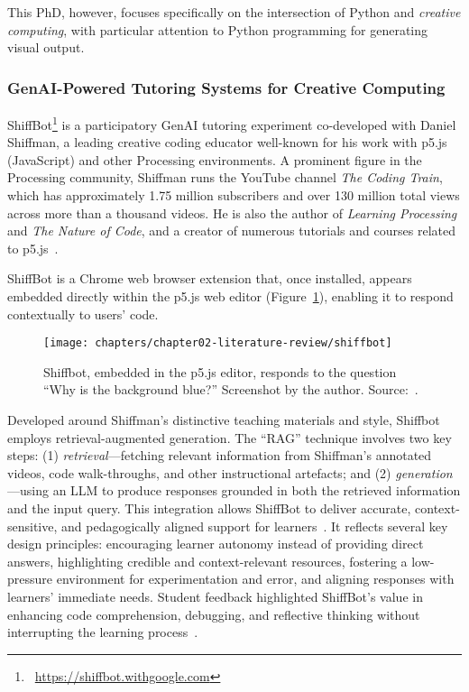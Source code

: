 This PhD, however, focuses specifically on the intersection of Python and \textit{creative computing}, with particular attention to Python programming for generating visual output.

\subsubsection{GenAI-Powered Tutoring Systems for Creative Computing}

ShiffBot\footnote{~\url{https://shiffbot.withgoogle.com}} is a participatory GenAI tutoring experiment co-developed with Daniel Shiffman, a leading creative coding educator well-known for his work with p5.js (JavaScript) and other Processing environments. A prominent figure in the Processing community, Shiffman runs the YouTube channel \textit{The Coding Train}, which has approximately 1.75 million subscribers and over 130 million total views across more than a thousand videos. He is also the author of \textit{Learning Processing} and \textit{The Nature of Code}, and a creator of numerous tutorials and courses related to p5.js~\cite{shiffman_coding_2025}. 

ShiffBot is a Chrome web browser extension that, once installed, appears embedded directly within the p5.js web editor (Figure~\ref{fig:shiffbot}), enabling it to respond contextually to users' code.

\begin{figure}[htbp]
\centering
\texttt{[image: chapters/chapter02-literature-review/shiffbot]}
\caption{Shiffbot, embedded in the p5.js editor, responds to the question ``Why is the background blue?'' Screenshot by the author. Source:~\cite{p5js_contributors_p5js_2025}.}
\label{fig:shiffbot}
\end{figure}

Developed around Shiffman's distinctive teaching materials and style, Shiffbot employs retrieval-augmented generation. The ``RAG'' technique involves two key steps: (1) \textit{retrieval}---fetching relevant information from Shiffman's annotated videos, code walk-throughs, and other instructional artefacts; and (2) \textit{generation}---using an LLM to produce responses grounded in both the retrieved information and the input query. This integration allows ShiffBot to deliver accurate, context-sensitive, and pedagogically aligned support for learners~\cite{rubinovitz_how_2024}. It reflects several key design principles: encouraging learner autonomy instead of providing direct answers, highlighting credible and context-relevant resources, fostering a low-pressure environment for experimentation and error, and aligning responses with learners' immediate needs. Student feedback highlighted ShiffBot's value in enhancing code comprehension, debugging, and reflective thinking without interrupting the learning process~\cite{jurenka_towards_2024}.

